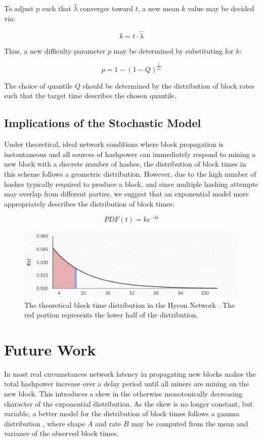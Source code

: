 \documentclass[]{article}
\begin{document}
To adjust p such that $\hat{\lambda}$ converges toward $t$, a new mean $k$ value may be decided via:

\begin{equation}
	k = t \cdot \hat{\lambda}
\end{equation} 

Thus, a new difficulty parameter $p$ may be determined by substituting for $k$: 

\begin{equation}
p = 1 - (1 - Q)^\frac{1}{t \hat{\lambda}} 
\end{equation}

The choice of quantile $Q$ should be determined by the distribution of block rates such that the target time describes the chosen quantile. 

\subsection{Implications of the Stochastic Model}  
Under theoretical, ideal network conditions where block propagation is instantaneous and all sources of hashpower can immediately respond to mining a new block with a discrete number of hashes, the distribution of block times in this scheme follows a geometric distribution.  However, due to the high number of hashes typically required to produce a block, and since multiple hashing attempts may overlap from different parties, we suggest that an exponential model more appropriately describes the distribution of block times: 

\begin{equation}
PDF(t) = ke^{-kt}
\end{equation}

\begin{figure}[h]
	\centering
	\includegraphics[width=0.7\linewidth]{"./ideal hycon"}
	\caption{\footnotesize The theoretical block time distribution in the Hycon Network \cite{HyconNetwork}. The red portion represents the lower half of the distribution. \cite{GammaDistHycon}}
\end{figure}

\section{Future Work}
In most real circumstances network latency in propagating new blocks makes the total hashpower increase over a delay period until all miners are mining on the new block.  This introduces a skew in the otherwise monotonically decreasing character of the exponential distribution.  As the skew is no longer constant, but variable, a better model for the distribution of block times follows a gamma distribution \cite{GammaDistDefinition}, where shape $A$ and rate $B$ may be computed from the mean and variance of the observed block times.  
\end{document}
